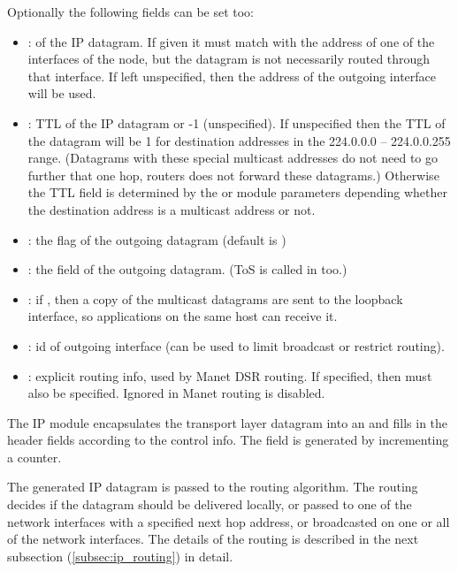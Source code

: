 Optionally the following fields can be set too:
\begin{itemize}
\item {}:  of the IP datagram. If given it must match with the
      address of one of the interfaces of the node, but the datagram is not necessarily
      routed through that interface. If left unspecified, then the address of the
      outgoing interface will be used.
\item {}: TTL of the IP datagram or -1 (unspecified). If unspecified then the TTL
      of the datagram will be 1 for destination addresses in the
      224.0.0.0 -- 224.0.0.255 range. (Datagrams with these special multicast addresses
      do not need to go further that one hop, routers does not forward these datagrams.)
      Otherwise the TTL field is determined by the  or
       module parameters depending whether the destination
      address is a multicast address or not.
\item {}: the  flag of the outgoing datagram (default is )
\item {}: the  field of the outgoing datagram.
      (ToS is called  in  too.)
\item {}: if , then a copy of the multicast datagrams
      are sent to the loopback interface, so applications on the same host can receive it.
\item {}: id of outgoing interface (can be used to limit broadcast or restrict routing).
\item {}: explicit routing info, used by Manet DSR routing. If specified, then
       must also be specified. Ignored in Manet routing is disabled.
\end{itemize}

The IP module encapsulates the transport layer datagram into an 
and fills in the header fields according to the control info. The 
field is generated by incrementing a counter.

The generated IP datagram is passed to the routing algorithm. The routing decides if the
datagram should be delivered locally, or passed to one of the network interfaces
with a specified next hop address, or broadcasted on one or all of the network interfaces.
The details of the routing is described in the next subsection (\ref{subsec:ip_routing})
in detail.

